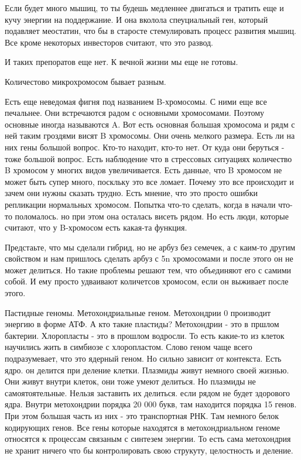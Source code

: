Если будет много мышиц, то ты будешь медленнее двигаться и тратить еще и 
кучу энергии на поддержание. И она вколола спеуциальный
ген, который подавляет меостатин, что бы в старосте стемулировать
процесс развития мышиц. Все кроме некоторых инвесторов считают, что
это развод.

И таких препоратов еще нет. К вечной жизни мы еще не готовы.

Количестово микрохромосом бывает разным.

Есть еще неведомая фигня под названием B-хромосомы. С ними еще
все печальнее. Они встречаются радом с основными хромосомами.
Поэтому основные иногда называются A. Вот есть основная большая
хромосома и рядм с ней таким гроздями висят B хромосомы. Они очень мелкого
размера. Есть ли на них гены большой вопрос. Кто-то находит, кто-то нет. От куда
они беруться - тоже большой вопрос. Есть наблюдение что в
стрессовых ситуациях количество B хромосом у многих
видов увеличивается. Есть данные, что B хромосом не может
быть супер много, поскльку это все ломает. Почему это все происходит и
зачем они нужны сказать трудно. Есть мнение, что это просто ошибки репликации
нормальных хромосом. Попытка что-то сделать, когда в начали что-то
поломалось. но при этом она осталась висеть рядом. Но есть люди, которые
считают, что у B-хромосом есть какая-та функция.

Предстаьте, что мы сделали гибрид, но не арбуз
без семечек, а с каим-то другим свойством и нам пришлось сделать
арбуз с 5n хромосомами и после этого он не может делиться. Но такие
проблемы решают тем, что объединяют его с самими собой. И ему просто
удваивают количетсов хромосом, если он выживает после этого.

Пастидные геномы. Метохондриальные геном.
Метохондрии 0 производит энергию в форме АТФ. А кто
такие пластиды? Метохондрии - это в пршлом бактерии.
Хлоропласты - это в прошлом водросли. То есть
какие-то из клеток научились жить в симбиозе с
хлоропластом. Слово геном чаще всего подразумевает, что
это ядерный геном. Но сильно зависит от контекста.
Есть ядро. он делится при деление клетки. Плазмиды живут 
немного своей жизнью. Они живут внутри клеток, они тоже 
умеют делиться. Но плазмиды не самоятоятельные. Нельзя 
заставить их делиться. если рядом не будет здорового ядра. 
Внутри метохондрии порядка 20 000 букв, там 
находится порядка 15 генов. При этом большая часть из 
них - это транспортная РНК. Там немного белок кодирующих генов. 
Все гены которые находятся в метохондриальном геноме 
относятся к процессам связаным с синтезем энергии. 
То есть сама метохондрия не хранит ничего что бы контролировать 
свою струкуту, целостность и деление. 


